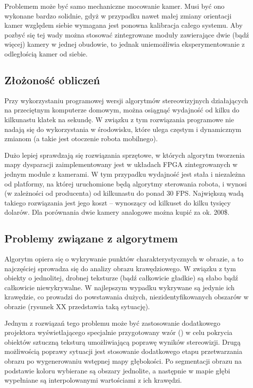 Problemem może być samo mechaniczne mocowanie kamer.
Musi być ono wykonane bardzo solidnie, gdyż w przypadku nawet małej zmiany orientacji
kamer względem siebie wymagana jest ponowna kalibracja całego systemu. Aby pozbyć
się tej wady można stosować zintegrowane moduły zawierające dwie (bądź więcej)
kamery w jednej obudowie, to jednak uniemożliwia eksperymentowanie z odległością
kamer od siebie.

\subsection{Złożoność obliczeń}

Przy wykorzystaniu programowej wersji algorytmów stereowizyjnych działających
na przeciętnym komputerze domowym, można osiągnąć wydajność od kilku do kilkunastu
klatek na sekundę. W związku z tym rozwiązania programowe
nie nadają się do wykorzystania w środowisku, które ulega częstym i dynamicznym
zmianom (a takie jest otoczenie robota mobilnego).

Dużo lepiej sprawdzają się rozwiązania sprzętowe, w których algorytm tworzenia
mapy dysparacji zaimplementowany jest w układach FPGA zintegrowanych w jednym
module z kamerami. W tym przypadku wydajność jest stała i niezależna od platformy,
na której uruchomione będą algorytmy sterowania robota, i wynosi (w zależności
od producenta) od kilkunastu do ponad 30 FPS. Największą wadą takiego rozwiązania
jest jego koszt -- wynoszący od kilkuset do kilku tysięcy dolarów. Dla porównania
dwie kamery analogowe można kupić za ok. 200\$.

\subsection{Problemy związane z algorytmem}

Algorytm opiera się o wykrywanie punktów charakterystycznych w obrazie, a to najczęściej
sprowadza się do analizy obrazu krawędziowego. W związku z tym obiekty o jednolitej,
drobnej teksturze (bądź całkowicie gładkie) są słabo bądź całkowicie niewykrywalne.
W najlepszym wypadku wykrywane są jedynie ich krawędzie, co prowadzi do powstawania
dużych, niezidentyfikowanych obszarów w obrazie (rysunek XX przedstawia taką sytuację).

Jednym z rozwiązań tego problemu może być zastosowanie dodatkowego projektora
wyświetlającego specjalnie przygotowany wzór (\cite{konolige-icra-2010-a}) w celu
pokrycia obiektów sztuczną teksturą umożliwiającą poprawę wyników stereowizji.
Drugą możliwością poprawy sytuacji jest stosowanie dodatkowego etapu przetwarzania
obrazu po wygenerowaniu wstępnej mapy głębokości. Po segmentacji obrazu na podstawie
koloru wybierane są obszary jednolite, a następnie w mapie głębi wypełniane są
interpolowanymi wartościami z ich krawędzi.

